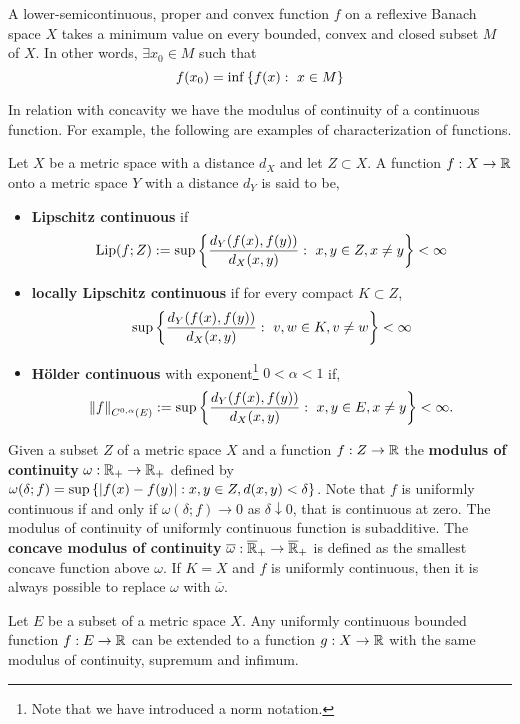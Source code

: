 A  lower-semicontinuous, proper and convex function $f$ on a reflexive Banach space $X$ takes a minimum value on every bounded, convex and closed subset $M$ of $X$. In other words, $\exists x_0 \in M$ such that
\begin{equation}
f(x_0)=\inf\left\lbrace f(x):\ x\in M \right\rbrace
\end{equation}



In relation with concavity we have the modulus of continuity of a continuous function. For example, the following are examples of characterization of functions.
\begin{definition}
	Let $X$ be a metric space with a distance $d_X$ and let $Z \subset X$. A function $f: X\rightarrow \mathbb{R}$ onto a metric space $Y$ with a distance $d_Y$ is said to be,
	\begin{itemize}
		\item \textbf{Lipschitz continuous} if
		\begin{equation*}
		\mathrm{Lip}(f; Z):=\sup\left\lbrace \frac{d_Y(f(x), f(y))}{d_X(x,y)}: \ x,y \in Z, x\neq y \right\rbrace < \infty
		\end{equation*}
		\item \textbf{locally Lipschitz continuous} if for every compact $K\subset Z$,
		\begin{equation*}
		\sup\left\lbrace \frac{d_Y(f(x), f(y))}{d_X(x,y)}: \ v,w \in K, v\neq w \right\rbrace<\infty
		\end{equation*}
		\item  \textbf{H\"older continuous} with exponent\footnote{Note that we have introduced a norm notation.} $0<\alpha<1$ if,
		\begin{equation*}
			\left\|f\right\|_{C^{0,\alpha}(E)}:=\sup\left\lbrace \frac{d_Y(f(x),f(y))}{d_X(x,y)}: \ x, y \in E, x\neq y \right\rbrace<\infty.
		\end{equation*}
	\end{itemize}
\end{definition}
Given a subset $Z$ of a metric space $X$ and a function $f: Z\rightarrow \mathbb{R}$ the \textbf{modulus of continuity} $\omega:\mathbb{R}_+\rightarrow \mathbb{R}_+$ defined by $\omega(\delta;f)=\sup\left\lbrace \left| f(x)-f(y) \right|: x,y \in Z, d(x,y)<\delta \right\rbrace$. Note that $f$ is uniformly continuous if and only if $\omega(\delta; f)\rightarrow 0$ as $\delta\downarrow 0$, that is continuous at zero. The modulus of continuity of uniformly continuous function is subadditive. The \textbf{concave modulus of continuity} $\overline{\omega}:\overline{\mathbb{R}}_+\rightarrow \overline{\mathbb{R}}_+$ is defined as the smallest concave function above $\omega$. If $K=X$ and $f$ is uniformly continuous, then it is always possible to replace $\omega$ with $\overline{\omega}$.
\begin{theorem}
	Let $E$ be a subset of a metric space $X$. Any uniformly continuous bounded function $f:E\rightarrow\mathbb{R}$ can be extended to a function $g:X\rightarrow \mathbb{R}$ with the same modulus of continuity, supremum and infimum.
\end{theorem}

